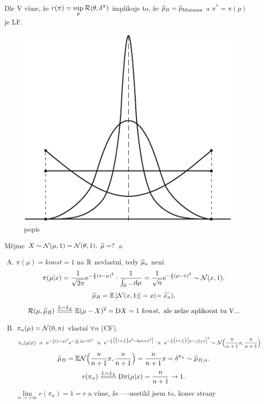 \begin{remark}
\begin{enumerate}[1)]
\begin{enumerate}[a)]
\[\begin{split}
			\end{split}
			\] 
			Dle V víme, že $r(\pi)=\sup\limits_{\theta}\mathcal{R}(\theta,\delta^\pi)$ implikuje to, že $\widehat{p}_B=\widehat{p}_\mathrm{Minimax}$ a $\pi^\ast=\pi(p)$ je LF.
			\begin{figure}[h]
				\centering
				\includegraphics[width=0.7\linewidth]{pictures/9_1}
				\caption{popis}
				\label{fig:91}
			\end{figure}			
		\end{enumerate}
	\end{enumerate}
\end{remark}
\begin{remark}
	Mějme $X\sim\mathcal{N}(\mu,1)=\mathcal{N}(\theta,1),~\widehat{\mu}=?$ a\begin{enumerate}[A)]
		\item $\pi(\mu)=konst=1$ na $\mathbb{R}$ nevlastní, tedy $\widehat{\mu}_a$ není. $$\pi(\mu|x)=\frac{1}{\sqrt{2\pi}}\mathrm{e}^{-\frac{1}{2}(x-\mu)^2}\cdot \frac{1}{\int_{\mathbb{R}}...\mathrm{d}\mu}=\frac{1}{\sqrt{n}}\mathrm{e}^{-\frac{1}{2}(\mu-x)^2}\sim\mathcal{N}(x,1).$$
		$$\widehat{\mu}_B=\EE{\NN(x,1)}=x(=\oxnn),$$
		$$ \RF(\mu,\widehat{\mu}_B)\equal{L=L_2}\E(\mu-X)^2=\D X=1~konst,\text{ ale nelze aplikovat tu V...}$$
		\item $\pi_n(\mu)=\mathcal{N}(0,n)$ vlastní $\forall n$ (CF).
		\[
		\begin{split}
		\pi_n(\mu|x)~\propto~ \mathrm{e}^{-\frac{1}{2}(x-\mu)^2}\mathrm{e}^{-\frac{1}{2n}(\mu-0)^2}~\propto~\mathrm{e}^{-\frac{1}{2}\big[\big(1+\frac{1}{n}\big)\mu^2-2\mu x+x^2\big]}~\propto~\mathrm{e}^{-\frac{1}{2}\big(1+\frac{1}{n}\big)\big[\mu-\frac{n}{n+1}x\big]^2}\sim \mathcal{N}\Big(\frac{n}{n+1}x,\frac{n}{n+1}\Big)
		\end{split}
		\]
		$$\widehat{\mu}_B=\mathbb{E} \mathcal{N}\Big(\frac{n}{n+1}x,\frac{n}{n+1}\Big)=\frac{n}{n+1}x=\delta^{\pi_n}\sim\widehat{\mu}_{B,n}.$$
		$$r(\pi_n)\equal{L=L_2}\D \pi(\mu|x)=\frac{n}{n+1}\to1.$$
		$\lim\limits_{n\to+\infty}r(\pi_n)=1=r$ a víme, že 
		----nestihl jsem to, konec strany
	\end{enumerate}
\end{remark}
